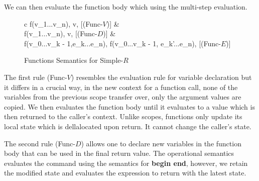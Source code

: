 \documentclass[a4paper,12pt]{report}
\begin{document}
\par
We can then evaluate the function body which using the multi-step evaluation.
\begin{figure}[H]
  \begin{center}
    \begin{tabular} {c}
      {\langle f(v_1...v_n), \sigma \rangle \Longrightarrow \langle v, \sigma \rangle} [(Func-$V$)]
      & \\
      {\langle f(v_1...v_n), \sigma \rangle \Longrightarrow \langle v, \sigma \rangle} [(Func-$D$)]
      & \\
      {\langle f(v_0...v_{k - 1},e_k...e_n), \sigma \rangle \Longrightarrow \langle f(v_0...v_{k - 1}, e_{k}'...e_n), \sigma \rangle} [(Func-$E$)]
    \end{tabular}
  \end{center}
  \caption{Functions Semantics for Simple-$R$}
\end{figure}

\par
The first rule (Func-$V$) resembles the evaluation rule for 
variable declaration but it differs in a crucial way, in the new context for a 
function call, none of the variables from the previous scope transfer over, only 
the argument values are copied. We then evaluates the function body until it 
evaluates to a value which is then returned to the caller's context. Unlike 
scopes, functions only update its local state which is dellalocated upon return. 
It cannot change the caller's state. 

\par
The second rule (Func-$D$) allows one to declare new variables in the function 
body that can be used in the final return value. The operational semantics 
evaluates the command using the semantics for \textbf{begin end}, however, we 
retain the modified state and evaluates the expression to return with the latest 
state. 
\end{document}

